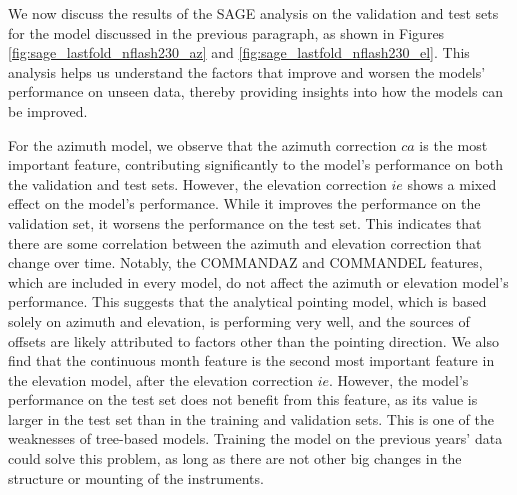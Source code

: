 We now discuss the results of the SAGE analysis on the validation and test sets for the model discussed in the previous paragraph,
as shown in Figures \ref{fig:sage_lastfold_nflash230_az} and \ref{fig:sage_lastfold_nflash230_el}.
This analysis helps us understand the factors that improve and worsen the models' performance on unseen data, thereby providing insights into how the models can be improved.

For the azimuth model, we observe that the azimuth correction $ca$ is the most important feature, contributing significantly to the model's performance on both the validation and test sets.
However, the elevation correction $ie$ shows a mixed effect on the model's performance.
While it improves the performance on the validation set, it worsens the performance on the test set.
This indicates that there are some correlation between the azimuth and elevation correction that change over time.
Notably, the COMMANDAZ and COMMANDEL features, which are included in every model, do not affect the azimuth or elevation model's performance.
This suggests that the analytical pointing model, which is based solely on azimuth and elevation, is performing very well, and the sources of offsets are likely attributed to factors other than the pointing direction.
We also find that the continuous month feature is the second most important feature in the elevation model, after the elevation correction $ie$.
However, the model's performance on the test set does not benefit from this feature, as its value is larger in the test set than in the training and validation sets.
This is one of the weaknesses of tree-based models.
Training the model on the previous years' data could solve this problem, as long as there are not other big changes in the structure or mounting of the instruments.

